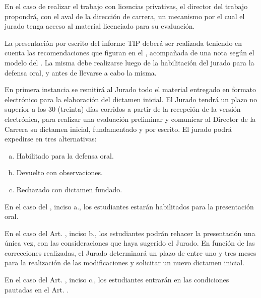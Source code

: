 \articulo En el caso de realizar el trabajo con licencias privativas, el director del trabajo 
propondrá, con el aval de la dirección de carrera,
un mecanismo por el cual el jurado tenga acceso al material licenciado para su
evaluación. 

\articulo La presentación por escrito del informe TIP deberá ser realizada
teniendo en cuenta las recomendaciones que figuran en el \anexoPresentacionInforme, acompañada de una nota
según el modelo del \anexoPresentacionInformeEscrito. La misma debe realizarse
luego de la habilitación del jurado para la defensa oral, y antes de llevarse a
cabo la misma.

\articulo En primera instancia se remitirá al Jurado todo el material entregado
en formato electrónico para la elaboración del dictamen inicial. El Jurado tendrá un
plazo no superior a los 30 (treinta) días corridos a partir de la recepción de la versión
electrónica, para realizar una evaluación preliminar y comunicar al Director de la
Carrera su dictamen inicial, fundamentado y por escrito. El jurado podrá expedirse en
tres alternativas:

\begin{enumerate}[a.]
\item Habilitado para la defensa oral.
\item Devuelto con observaciones.
\item Rechazado con dictamen fundado.
\end{enumerate}


\articulo En el caso del \artDictamenInicial, inciso a., los estudiantes
estarán habilitados para la presentación oral. 

\articulo En el caso del Art. \artDictamenInicial, inciso b., los estudiantes podrán rehacer
la presentación una única vez, con las consideraciones que haya sugerido el Jurado.
En función de las correcciones realizadas, el Jurado determinará un plazo de entre
uno y tres meses para la realización de las modificaciones y solicitar un nuevo
dictamen inicial.

\articulo En el caso del Art. \artDictamenInicial, inciso c., los estudiantes entrarán en las
condiciones pautadas en el Art. \artFinalizado. 

